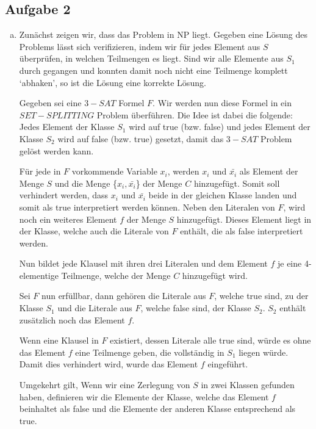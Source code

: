 \documentclass[12pt,a4paper]{article}
\begin{document}
\subsection*{Aufgabe 2}

\begin{enumerate}[a)] 
	
	\item Zunächst zeigen wir, dass das Problem in NP liegt. Gegeben eine Lösung des Problems lässt sich verifizieren, indem wir für jedes Element aus $S$ überprüfen, in welchen Teilmengen es liegt. Sind wir alle Elemente aus $S_1$ durch gegangen und konnten damit noch nicht eine Teilmenge komplett `abhaken', so ist die Lösung eine korrekte Lösung.
	
	Gegeben sei eine $3-SAT$ Formel $F$. Wir werden nun diese Formel in ein $SET-SPLITTING$ Problem überführen. Die Idee ist dabei die folgende: Jedes Element der Klasse $S_1$ wird auf true (bzw. false) und jedes Element der Klasse $S_2$ wird auf false (bzw. true) gesetzt, damit das $3-SAT$ Problem gelöst werden kann.
	
	Für jede in $F$ vorkommende Variable $x_i$, werden $x_i$ und $\bar{x_i}$ als Element der Menge $S$ und die Menge \{$x_i, \bar{x_i}$\} der Menge $C$ hinzugefügt. Somit soll verhindert werden, dass $x_i$ und $\bar{x_i}$ beide in der gleichen Klasse landen und somit als true interpretiert werden können. Neben den Literalen von $F$, wird noch ein weiteres Element $f$ der Menge $S$ hinzugefügt. Dieses Element liegt in der Klasse, welche auch die Literale von $F$ enthält, die als false interpretiert werden.
	
	Nun bildet jede Klausel mit ihren drei Literalen und dem Element $f$ je eine 4-elementige Teilmenge, welche der Menge $C$ hinzugefügt wird.  
	
	Sei $F$ nun erfüllbar, dann gehören die Literale aus $F$, welche true sind, zu der Klasse $S_1$ und die Literale aus $F$, welche false sind, der Klasse $S_2$. $S_2$ enthält zusätzlich noch das Element $f$. 
	
	Wenn eine Klausel in $F$ existiert, dessen Literale alle true sind, würde es ohne das Element $f$ eine Teilmenge geben, die vollständig in $S_1$ liegen würde. Damit dies verhindert wird, wurde das Element $f$ eingeführt.
	
	Umgekehrt gilt, Wenn wir eine Zerlegung von $S$ in zwei Klassen gefunden haben, definieren wir die Elemente der Klasse, welche das Element $f$ beinhaltet als false und die Elemente der anderen Klasse entsprechend als true.
	

\end{enumerate}
\end{document}
